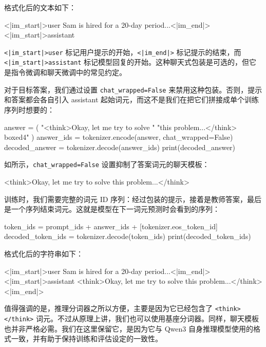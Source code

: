 格式化后的文本如下：

\begin{codebox}
<|im_start|>user
Sam is hired for a 20-day period...<|im_end|>
<|im_start|>assistant
\end{codebox}

\texttt{\textless{}|im\_start|\textgreater{}user} 标记用户提示的开始，\texttt{\textless{}|im\_end|\textgreater{}} 标记提示的结束，而 \texttt{\textless{}|im\_start|\textgreater{}assistant} 标记模型回复的开始。这种聊天式包装是可选的，但它是指令微调和聊天微调中的常见约定。

对于目标答案，我们通过设置 \texttt{chat\_wrapped=False} 来禁用这种包装。否则，提示和答案都会各自引入 assistant 起始词元，而这不是我们在把它们拼接成单个训练序列时想要的：

\begin{codebox}
answer = (
    "<think>Okay, let me try to solve "
    "this problem...</think> \\boxed{4}"
)
answer_ids = tokenizer.encode(answer, chat_wrapped=False)
decoded_answer = tokenizer.decode(answer_ids)
print(decoded_answer)
\end{codebox}

如所示，\texttt{chat\_wrapped=False} 设置抑制了答案词元的聊天模板：

\begin{codebox}
<think>Okay, let me try to solve this problem...</think> 
\end{codebox}

训练时，我们需要完整的词元 ID 序列：经过包装的提示，接着是教师答案，最后是一个序列结束词元。这就是模型在下一词元预测时会看到的序列：

\begin{codebox}
token_ids = prompt_ids + answer_ids + [tokenizer.eos_token_id]
decoded_token_ids = tokenizer.decode(token_ids)
print(decoded_token_ids)
\end{codebox}

格式化后的字符串如下：

\begin{codebox}
<|im_start|>user
Sam is hired for a 20-day period...<|im_end|>
<|im_start|>assistant
<think>Okay, let me try to solve this problem...</think><|im_end|>
\end{codebox}

值得强调的是，推理分词器之所以方便，主要是因为它已经包含了 \texttt{\textless{}think\textgreater{}\textless{}/think\textgreater{}} 词元。不过从原理上讲，我们也可以使用基座分词器。同样，聊天模板也并非严格必需。我们在这里保留它，是因为它与 Qwen3 自身推理模型使用的格式一致，并有助于保持训练和评估设定的一致性。

